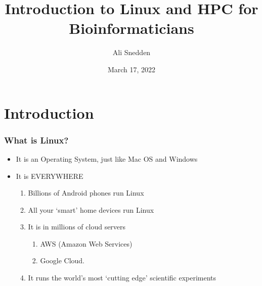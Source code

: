 \documentclass{beamer}
\title{Introduction to Linux and HPC for Bioinformaticians }
\author{Ali Snedden}
\institute{Nationwide Children's Hospital}
\date{March 17, 2022}
\begin{document}
 
\frame{\titlepage}

\section{Introduction}

\begin{frame}
\frametitle{What is Linux?}
\begin{itemize}
    \item It is an Operating System, just like Mac OS and Windows  
    \pause 
    \item It is EVERYWHERE
    \begin{enumerate}
        \item Billions of Android phones run Linux
        \pause 
        \item All your `smart' home devices run Linux
        \pause 
        \item It is in millions of cloud servers
        \begin{enumerate}
            \item AWS (Amazon Web Services)
            \pause
            \item Google Cloud.
        \end{enumerate}
        \pause 
        \item It runs the world's most `cutting edge' scientific experiments
    \end{enumerate}
\end{itemize}
\end{frame}
\end{document}
